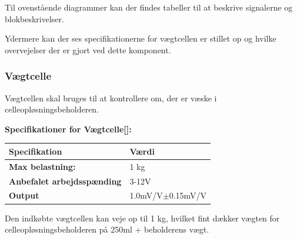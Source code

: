 Til ovenstående diagrammer kan der findes tabeller til at beskrive signalerne og blokbeskrivelser. 

Ydermere kan der ses specifikationerne for vægtcellen er stillet op og hvilke overvejelser der er gjort ved dette komponent.
\subsubsection{Vægtcelle}
\label{subsec:loadcell}
Vægtcellen skal bruges til at kontrollere om, der er væske i celleopløsningsbeholderen.

\textbf{Specifikationer for Vægtcelle[\citet{DH7}]:} 
\begin{center}
		\begin{longtable}{ | m{6.5cm} | m{6.5cm}| } 
			\hline
			\textbf{Specifikation} &\textbf{Værdi} \\ 
			\hline
			\textbf{Max belastning:} & 1 kg \\ 
			\hline
			\textbf{Anbefalet arbejdsspænding} & 3-12V \\ 
			\hline
			\textbf{Output} & 1.0mV/V$\pm$0.15mV/V \\ 
			\hline
		\end{longtable}
\end{center}

Den indkøbte vægtcellen kan veje op til 1 kg, hvilket fint dækker vægten for celleopløsningsbeholderen på 250ml + beholderens vægt.


